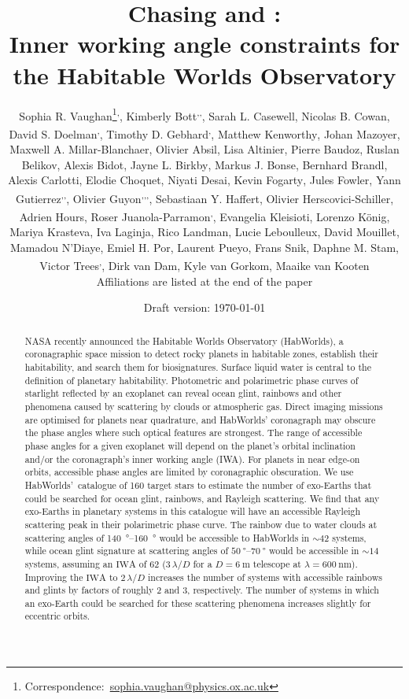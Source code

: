 \documentclass[usenatbib]{mnras}
\title{Chasing \rainbows and \oceanglint:\\ Inner working angle constraints for the Habitable Worlds Observatory}
\author[Sophia R. Vaughan et al.]{%
    Sophia R. Vaughan\thanks{Correspondence:~\url{sophia.vaughan@physics.ox.ac.uk}}\textsuperscript{,\afflink{1}},
    Kimberly Bott\textsuperscript{\afflink{2},\afflink{3},\afflink{4}},
    Sarah L. Casewell\textsuperscript{\afflink{5}},
    Nicolas B. Cowan\textsuperscript{\afflink{6}},
    David S. Doelman\textsuperscript{\afflink{7},\afflink{8}},
    \newauthor
    Timothy D. Gebhard\textsuperscript{\afflink{9},\afflink{10}},
    Matthew Kenworthy\textsuperscript{\afflink{7}},
    Johan Mazoyer\textsuperscript{\afflink{11}},
    Maxwell A. Millar-Blanchaer\textsuperscript{\afflink{12}},
    \newauthor
    Olivier Absil\textsuperscript{\afflink{13}},
    Lisa Altinier\textsuperscript{\afflink{14}},
    Pierre Baudoz\textsuperscript{\afflink{11}},
    Ruslan Belikov\textsuperscript{\afflink{15}},
    Alexis Bidot\textsuperscript{\afflink{16}},
    Jayne L. Birkby\textsuperscript{\afflink{1}},
    \newauthor
    Markus J. Bonse\textsuperscript{\afflink{10}},
    Bernhard Brandl\textsuperscript{\afflink{7}},
    Alexis Carlotti\textsuperscript{\afflink{16}},
    Elodie Choquet\textsuperscript{\afflink{14}},
    Niyati Desai\textsuperscript{\afflink{17}},
    \newauthor
    Kevin Fogarty\textsuperscript{\afflink{15}},
    Jules Fowler\textsuperscript{\afflink{18}},
    Yann Gutierrez\textsuperscript{\afflink{11},\afflink{19},\afflink{20}},
    Olivier Guyon\textsuperscript{\afflink{21},\afflink{22},\afflink{23},\afflink{24}},
    Sebastiaan Y. Haffert\textsuperscript{\afflink{21}},
    \newauthor
    Olivier Herscovici-Schiller\textsuperscript{\afflink{19}},
    Adrien Hours\textsuperscript{\afflink{16}},
    Roser Juanola-Parramon\textsuperscript{\afflink{25},\afflink{26}},
    Evangelia Kleisioti\textsuperscript{\afflink{7}},
    \newauthor
    Lorenzo König\textsuperscript{\afflink{13}},
    Mariya Krasteva\textsuperscript{\afflink{27}},
    Iva Laginja\textsuperscript{\afflink{11}},
    Rico Landman\textsuperscript{\afflink{7}},
    Lucie Leboulleux\textsuperscript{\afflink{16}},
    \newauthor
    David Mouillet\textsuperscript{\afflink{16}},
    Mamadou N’Diaye\textsuperscript{\afflink{28}},
    Emiel H. Por\textsuperscript{\afflink{29}},
    Laurent Pueyo\textsuperscript{\afflink{29}},
    Frans Snik\textsuperscript{\afflink{7}},
    \newauthor
    Daphne M. Stam\textsuperscript{\afflink{30}},
    Victor Trees\textsuperscript{\afflink{31},\afflink{32}},
    Dirk van Dam\textsuperscript{\afflink{7}},
    Kyle van Gorkom\textsuperscript{\afflink{21}},
    Maaike van Kooten\textsuperscript{\afflink{33}}
    \newauthor \\%
    Affiliations are listed at the end of the paper
}
\date{Draft version: \today}
\newcommand{\IWA}{\ensuremath{\mathrm{IWA}}\xspace}
\newcommand{\HWO}{HabWorlds\xspace}
\begin{document}
 

\maketitle

\begin{abstract}
NASA recently announced the Habitable Worlds Observatory (\HWO), a coronagraphic space mission to detect rocky planets in habitable zones, establish their habitability, and search them for biosignatures. 
Surface liquid water is central to the definition of planetary habitability.
%
Photometric and polarimetric phase curves of starlight reflected by an exoplanet can reveal ocean glint, rainbows and other phenomena caused by scattering by clouds or atmospheric gas.
%
Direct imaging missions are optimised for planets near quadrature, and \HWO' coronagraph may obscure the phase angles where such optical features are strongest. 
%
The range of accessible phase angles for a given exoplanet will depend on the planet's orbital inclination and/or the coronagraph's inner working angle (IWA). 
%
For planets in near edge-on orbits, accessible phase angles are limited by coronagraphic obscuration. 
%
We use \HWO'~catalogue of 160 target stars to estimate the number of exo-Earths that could be searched for ocean glint, rainbows, and Rayleigh scattering. 
%
We find that any exo-Earths in planetary systems in this catalogue will have an accessible Rayleigh scattering peak in their polarimetric phase curve. 
%
The rainbow due to water clouds at scattering angles of \qtyrange{140}{160}{\degree} would be accessible to \HWO in $\sim\num{42}$ systems, while ocean glint signature at scattering angles of $\qtyrange{50}{70}{\degree}$ would be accessible in $\sim\num{14}$ systems, assuming an \IWA of \qty{62}{\mas} ($3\,\lambda/D$ for a $D=\qty{6}{\meter}$ telescope at $\lambda=\qty{600}{\nano\meter}$).
%
Improving the \IWA to $2\,\lambda/D$ increases the number of systems with accessible rainbows and glints by factors of roughly 2 and 3, respectively.
%
The number of systems in which an exo-Earth could be searched for these scattering phenomena increases slightly for eccentric orbits.  %
\end{abstract}
\end{document}

